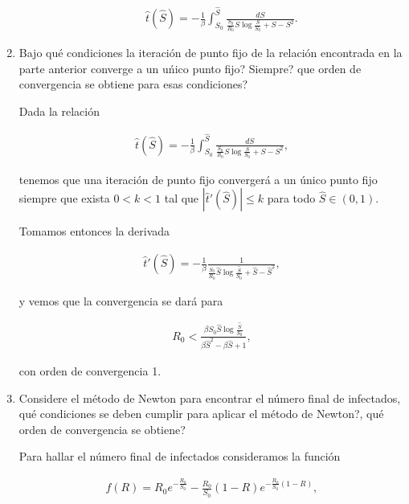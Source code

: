 \documentclass[answers]{exam}
\begin{document}
\begin{questions}
\begin{enumerate}
\begin{enumerate}
\begin{solution}
\begin{align*}
    \hat{t}(\hat{S}) = -\frac{1}{\beta}\int_{S_0}^{\hat{S}} \frac{dS}{\frac{S_0}{R_0}S\log{\frac{S}{S_0}} + S - S^2}.
\end{align*}
\end{solution}

\end{enumerate}

\item Bajo qu\'e condiciones la iteraci\'on de punto fijo de la relaci\'on encontrada en la parte anterior converge a un u\'nico punto fijo? Siempre? que orden de convergencia se obtiene para esas condiciones?

\begin{solution}
Dada la relación

\begin{align*}
    \hat{t}(\hat{S}) = -\frac{1}{\beta}\int_{S_0}^{\hat{S}} \frac{dS}{\frac{S_0}{R_0}S\log{\frac{S}{S_0}} + S - S^2},
\end{align*}

tenemos que una iteración de punto fijo convergerá a un único punto fijo siempre que exista $0 < k < 1$ tal que $|\hat{t}'(\hat{S})| \leq k$ para todo $\hat{S} \in (0,1)$.

Tomamos entonces la derivada

\begin{align*}
    \hat{t}'(\hat{S}) = -\frac{1}{\beta} \frac{1}{\frac{S_0}{R_0}\hat{S}\log{\frac{\hat{S}}{S_0}} + \hat{S} - \hat{S}^2},
\end{align*}

y vemos que la convergencia se dará para

\begin{align*}
    R_0 < \frac{\beta S_0\hat{S}\log{\frac{\hat{S}}{S_0}}}{\beta\hat{S}^2 - \beta\hat{S} + 1},
\end{align*}

con orden de convergencia 1.
\end{solution}

\item Considere el m\'etodo de Newton para encontrar el número final de infectados, qu\'e condiciones se deben cumplir para aplicar el m\'etodo de Newton?, qu\'e orden de convergencia se obtiene?

\begin{solution}
Para hallar el número final de infectados consideramos la función

\begin{align*}
    f(R) = R_0e^{-\frac{R_0}{S_0}} - \frac{R_0}{S_0}(1 - R)e^{-\frac{R_0}{S_0}(1 - R)},
\end{align*}


\end{solution}
\end{enumerate}
\end{questions}
\end{document}
